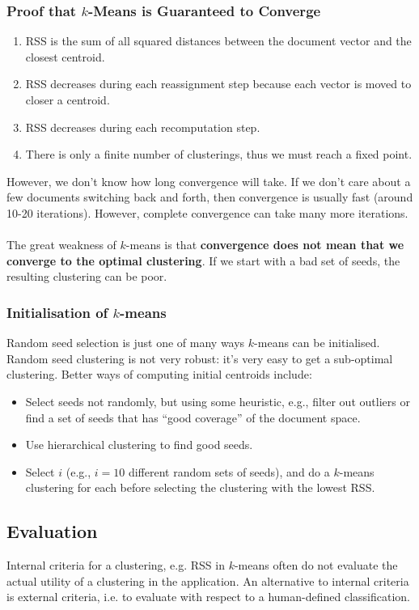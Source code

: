 \documentclass[a4paper,11pt]{article}
\begin{document}
\subsubsection{Proof that $k$-Means is Guaranteed to Converge}
\begin{enumerate}
    \item   RSS is the sum of all squared distances between the document vector and the closest centroid.
    \item   RSS decreases during each reassignment step because each vector is moved to closer a centroid.
    \item   RSS decreases during each recomputation step.
    \item   There is only a finite number of clusterings, thus we must reach a fixed point.
\end{enumerate}

However, we don't know how long convergence will take.
If we don't care about a few documents switching back and forth, then convergence is usually fast (around 10-20 iterations).
However, complete convergence can take many more iterations.
\\\\
The great weakness of $k$-means is that \textbf{convergence does not mean that we converge to the optimal clustering}.
If we start with a bad set of seeds, the resulting clustering can be poor.

\subsubsection{Initialisation of $k$-means}
Random seed selection is just one of many ways $k$-means can be initialised.
Random seed clustering is not very robust: it's very easy to get a sub-optimal clustering.
Better ways of computing initial centroids include:
\begin{itemize}
    \item   Select seeds not randomly, but using some heuristic, e.g., filter out outliers or find a set of seeds that has ``good coverage'' of the document space.
    \item   Use hierarchical clustering to find good seeds.
    \item   Select $i$ (e.g., $i = 10$ different random sets of seeds), and do a $k$-means clustering for each before selecting the clustering with the lowest RSS.
\end{itemize}

\subsection{Evaluation}
Internal criteria for a clustering, e.g. RSS in $k$-means often do not evaluate the actual utility of a clustering in the application.
An alternative to internal criteria is external criteria, i.e. to evaluate with respect to a human-defined classification.
\end{document}
